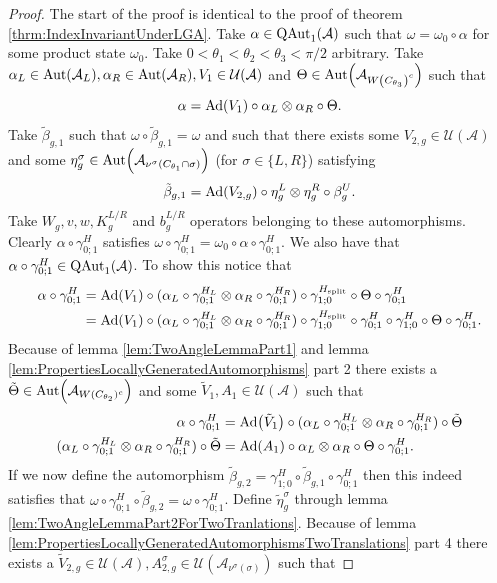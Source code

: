 \documentclass[12pt,a4paper,twoside]{article}
\let\originalleft\left
\let\originalright\right
\renewcommand{\left}{\mathopen{}\mathclose\bgroup\originalleft}
\renewcommand{\right}{\aftergroup\egroup\originalright}
\newcommand{\UU}{\mathcal U}
\renewcommand{\AA}{\mathcal A}
\newcommand{\Ad}[1]{\textrm{Ad}\left(#1\right)}
\newcommand{\Aut}[1]{\textrm{Aut}\left(#1\right)}
\newcommand{\QAut}[1]{\textrm{QAut}_1\left(#1\right)}
\theoremstyle{definition}
\numberwithin{equation}{section}
\begin{document}
\begin{proof}
	The start of the proof is identical to the proof of theorem \ref{thrm:IndexInvariantUnderLGA}. Take $\alpha\in\QAut{\AA}$ such that $\omega=\omega_0\circ\alpha$ for some product state $\omega_0$. Take $0<\theta_1<\theta_2<\theta_3<\pi/2$ arbitrary. Take $\alpha_L\in\Aut{\AA_L},\alpha_R\in\Aut{\AA_R},V_1\in\UU(\AA)$ and $\Theta\in\Aut{\AA_{W\left(C_{\theta_3}\right)^c}}$ such that
	\begin{equation}
		\alpha=\Ad{V_1}\circ\alpha_L\otimes\alpha_R\circ\Theta.
	\end{equation}
	Take $\tilde{\beta}_{g,1}$ such that $\omega\circ\tilde{\beta}_{g,1}=\omega$ and such that there exists some $V_{2,g}\in\UU(\AA)$ and some $\eta_g^{\sigma}\in\Aut{\AA_{\nu^{\sigma}(C_{\theta_1}\cap\sigma)}}$ (for $\sigma\in\{L,R\}$) satisfying
	\begin{equation}
		\tilde{\beta}_{g,1}=\Ad{V_{2,g}}\circ\eta_{g}^L\otimes\eta_{g}^R\circ\beta_g^U.
	\end{equation}
	Take $W_g,v,w,K_g^{L/R}$ and $b_g^{L/R}$ operators belonging to these automorphisms. Clearly $\alpha\circ\gamma^H_{0;1}$ satisfies $\omega\circ\gamma^{H}_{0;1}=\omega_0\circ\alpha\circ\gamma^{H}_{0;1}$. We also have that $\alpha\circ\gamma^H_{0;1}\in\QAut{\AA}$. To show this notice that
	\begin{align}
		\alpha\circ\gamma^H_{0;1}&=\Ad{V_1}\circ(\alpha_L\circ\gamma^{H_L}_{0;1}\otimes\alpha_R\circ\gamma^{H_R}_{0;1})\circ\gamma^{H_\text{split}}_{1;0}\circ\Theta\circ\gamma^H_{0;1}\\
		&=\Ad{V_1}\circ(\alpha_L\circ\gamma^{H_L}_{0;1}\otimes\alpha_R\circ\gamma^{H_R}_{0;1})\circ\gamma^{H_\text{split}}_{1;0}\circ\gamma^{H}_{0;1}\circ\gamma^{H}_{1;0}\circ\Theta\circ\gamma^H_{0;1}.
	\end{align}
	Because of lemma \ref{lem:TwoAngleLemmaPart1} and lemma \ref{lem:PropertiesLocallyGeneratedAutomorphisms} part 2 there exists a $\tilde{\Theta}\in\Aut{\AA_{W(C_{\theta_2})^c}}$ and some $\tilde V_1,A_1\in\UU(\AA)$ such that
	\begin{align}
		\alpha\circ\gamma^H_{0;1}&=\Ad{\tilde V_1}\circ(\alpha_L\circ\gamma^{H_L}_{0;1}\otimes\alpha_R\circ\gamma^{H_R}_{0;1})\circ\tilde\Theta\\
		(\alpha_L\circ\gamma^{H_L}_{0;1}\otimes\alpha_R\circ\gamma^{H_R}_{0;1})\circ\tilde\Theta&=\Ad{A_1}\circ \alpha_L\otimes\alpha_R\circ\Theta\circ\gamma^{H}_{0;1}.
	\end{align}
	If we now define the automorphism $\tilde{\beta}_{g,2}=\gamma^{H}_{1;0}\circ\tilde\beta_{g,1}\circ\gamma^{H}_{0;1}$ then this indeed satisfies that $\omega\circ\gamma^{H}_{0;1}\circ\tilde{\beta}_{g,2}=\omega\circ\gamma^{H}_{0;1}$. Define $\tilde\eta_g^\sigma$ through lemma \ref{lem:TwoAngleLemmaPart2ForTwoTranlations}. Because of lemma \ref{lem:PropertiesLocallyGeneratedAutomorphismsTwoTranslations} part 4 there exists a $\tilde V_{2,g}\in\UU(\AA),A_{2,g}^{\sigma}\in\UU(\AA_{\nu^{\sigma}(\sigma)})$ such that

\end{proof}
\end{document}
